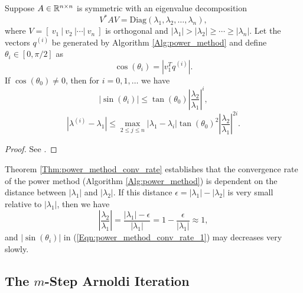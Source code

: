 \begin{theorem}			\label{Thm:power_method_conv_rate}
Suppose $A \in {\mathbb R}^{n \times n}$ is symmetric with an eigenvalue decomposition
\[
V^*AV = \text{Diag}(\lambda_1, \lambda_2, \ldots, \lambda_n),
\]
where $V = [\ v_1 \ | \ v_2 \ | \cdots | \ v_n \ ]$ is orthogonal and $|\lambda_1| > |\lambda_2| \geq \cdots \geq |\lambda_n|$.  Let the vectors $q^{(i)}$ be generated by Algorithm \ref{Alg:power_method} and define $\theta_i \in [0, \pi/2]$ as 
\[
	\cos(\theta_i) = \left| v_1^Tq^{(i)} \right|.
\]
If $\cos(\theta_0) \neq 0$, then for $i = 0, 1, \ldots$ we have 
\begin{equation} 		\label{Eqn:power_method_conv_rate_1}
\left| \sin(\theta_i) \right| \leq \tan(\theta_0) \left| \frac{\lambda_2}{\lambda_1} \right|^i,
\end{equation}
\begin{equation} 		\label{Eqn:power_method_conv_rate_2}
\left| \lambda^{(i)} - \lambda_1 \right| \leq \max_{2 \leq j \leq n} \left| \lambda_1 - \lambda_i \right| \tan(\theta_0)^2 \left| \frac{\lambda_2}{\lambda_1} \right|^{2i}.
\end{equation}
\end{theorem}

\begin{proof}
See \cite[Theorem 8.2.1]{golub2012matrix}.
\end{proof}

Theorem \ref{Thm:power_method_conv_rate} establishes that the convergence rate of the power method (Algorithm \ref{Alg:power_method}) is dependent on the distance between $|\lambda_1|$ and $|\lambda_2|$.  If this distance $\epsilon = |\lambda_1| - |\lambda_2|$ is very small relative to $|\lambda_1|$, then we have
\[
\left| \frac{\lambda_2}{\lambda_1} \right| = \frac{|\lambda_1| - \epsilon}{|\lambda_1|} = 1 - \frac{\epsilon}{|\lambda_1|} \approx 1,
\]
and $|\sin(\theta_i)|$ in (\ref{Eqn:power_method_conv_rate_1}) may decreases very slowly.  







\subsection{The $m$-Step Arnoldi Iteration} 			\label{Subsubsec:evol_mats-Arnoldi}


